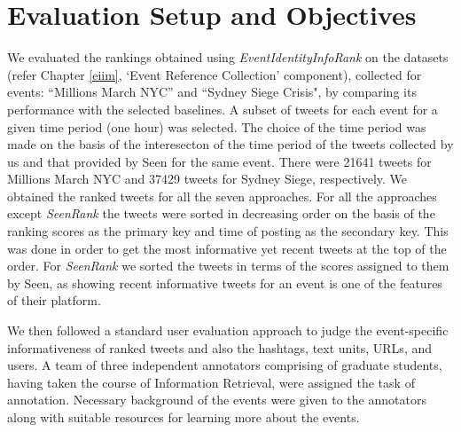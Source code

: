 \section{Evaluation Setup and Objectives}
We evaluated the rankings obtained using \textit{EventIdentityInfoRank} on the  datasets (refer Chapter \ref{eiim}, `Event Reference Collection' component), collected for events: ``Millions March NYC'' and ``Sydney Siege Crisis", by comparing its performance with the selected baselines. A subset of tweets for each event for a given time period (one hour) was selected. The choice of the time period was made on the basis of the interesecton of the time period of the tweets collected by us and that provided by Seen for the same event. There were 21641 tweets for Millions March NYC and 37429 tweets for Sydney Siege, respectively. We obtained the ranked tweets for all the seven approaches. For all the approaches except \textit{SeenRank} the tweets were sorted in decreasing order on the basis of the ranking scores as the primary key and time of posting as the secondary key. This was done in order to get the most informative yet recent tweets at the top of the order. For \textit{SeenRank} we sorted the tweets in terms of the scores assigned to them by Seen, as showing recent informative tweets for an event is one of the features of their platform.

We then followed a standard user evaluation approach to judge the event-specific informativeness of ranked tweets and also the hashtags, text units, URLs, and users.  A team of three independent annotators comprising of graduate students, having taken the course of Information Retrieval, were assigned the task of annotation. Necessary background of the events were given to the annotators along with suitable resources for learning more about the events.


